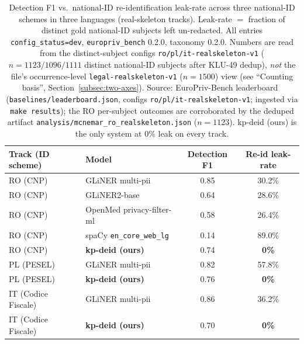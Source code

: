 \documentclass[11pt]{article}
\begin{document}
\begin{table}[t]
\centering
\small
\caption{Detection F1 vs.\ national-ID re-identification leak-rate across three national-ID schemes
in three languages (real-skeleton tracks). Leak-rate $=$ fraction of distinct gold national-ID
subjects left un-redacted. All entries \texttt{config\_status=dev}, \texttt{europriv\_bench} 0.2.0,
taxonomy 0.2.0. Numbers are read from the distinct-subject configs
\texttt{ro/pl/it-realskeleton-v1} ($n{=}1123/1096/1111$ distinct national-ID subjects after KLU-49
dedup), \emph{not} the file's occurrence-level \texttt{legal-realskeleton-v1} ($n{=}1500$) view (see
``Counting basis'', Section~\ref{subsec:two-axes}). Source: EuroPriv-Bench
leaderboard~\cite{europrivbench2026} (\texttt{baselines/leaderboard.json}, configs
\texttt{ro/pl/it-realskeleton-v1}; ingested via \texttt{make results}); the RO per-subject outcomes
are corroborated by the deduped artifact \texttt{analysis/mcnemar\_ro\_realskeleton.json} ($n{=}1123$).
kp-deid (ours) is the only system at $0\%$ leak on every track.}
\label{tab:dissociation}
\begin{tabular}{llcc}
\toprule
Track (ID scheme) & Model & Detection F1 & Re-id leak-rate \\
\midrule
RO (CNP)  & GLiNER multi-pii          & 0.85 & 30.2\% \\
RO (CNP)  & GLiNER2-base              & 0.64 & 28.6\% \\
RO (CNP)  & OpenMed privacy-filter-ml & 0.58 & 26.4\% \\
RO (CNP)  & spaCy \texttt{en\_core\_web\_lg} & 0.14 & 89.0\% \\
RO (CNP)  & \textbf{kp-deid (ours)}   & 0.74 & \textbf{0\%} \\
\midrule
PL (PESEL)& GLiNER multi-pii          & 0.82 & 57.8\% \\
PL (PESEL)& \textbf{kp-deid (ours)}   & 0.76 & \textbf{0\%} \\
\midrule
IT (Codice Fiscale) & GLiNER multi-pii & 0.86 & 36.2\% \\
IT (Codice Fiscale) & \textbf{kp-deid (ours)} & 0.70 & \textbf{0\%} \\
\bottomrule
\end{tabular}
\end{table}
\end{document}
